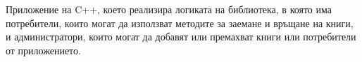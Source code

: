 \label{index_md_Header_Library}%
%
 Приложение на C++, което реализира логиката на библиотека, в която има потребители, които могат да използват методите за заемане и връщане на книги, и администратори, които могат да добавят или премахват книги или потребители от приложението. 